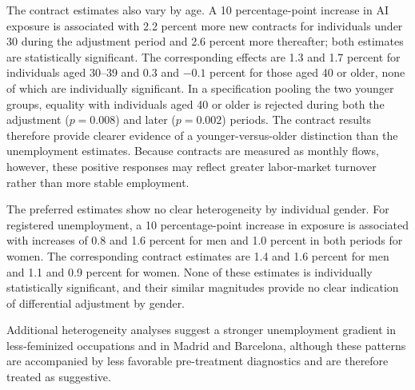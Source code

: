 The contract estimates also vary by age. A 10 percentage-point increase in AI exposure is associated with 2.2 percent more new contracts for individuals under 30 during the adjustment period and 2.6 percent more thereafter; both estimates are statistically significant. The corresponding effects are 1.3 and 1.7 percent for individuals aged 30--39 and 0.3 and \(-0.1\) percent for those aged 40 or older, none of which are individually significant. In a specification pooling the two younger groups, equality with individuals aged 40 or older is rejected during both the adjustment (\(p=0.008\)) and later (\(p=0.002\)) periods. The contract results therefore provide clearer evidence of a younger-versus-older distinction than the unemployment estimates. Because contracts are measured as monthly flows, however, these positive responses may reflect greater labor-market turnover rather than more stable employment.

The preferred estimates show no clear heterogeneity by individual gender. For registered unemployment, a 10 percentage-point increase in exposure is associated with increases of 0.8 and 1.6 percent for men and 1.0 percent in both periods for women. The corresponding contract estimates are 1.4 and 1.6 percent for men and 1.1 and 0.9 percent for women. None of these estimates is individually statistically significant, and their similar magnitudes provide no clear indication of differential adjustment by gender.


Additional heterogeneity analyses suggest a stronger unemployment gradient in less-feminized occupations and in Madrid and Barcelona, although these patterns are accompanied by less favorable pre-treatment diagnostics and are therefore treated as suggestive.

